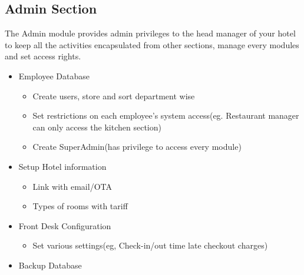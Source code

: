 \documentclass{scrreprt}
\begin{document}
\subsection{Admin Section}
The Admin module provides admin privileges to the head manager of your hotel to keep all the activities encapsulated from other sections, manage every modules and set access rights.
\begin{itemize}
\item Employee Database
\begin{itemize}
\item Create users, store and sort department wise
\item Set restrictions on each employee’s system access(eg. Restaurant manager can only access the kitchen section)
\item Create SuperAdmin(has privilege to access every module)
\end{itemize}
\item Setup Hotel information
\begin{itemize}
\item Link with email/OTA
\item Types of rooms with tariff
\end{itemize}
\item Front Desk Configuration
\begin{itemize}
\item Set various settings(eg, Check-in/out time late checkout charges)
\end{itemize}
\item Backup Database
\end{itemize}
\end{document}
